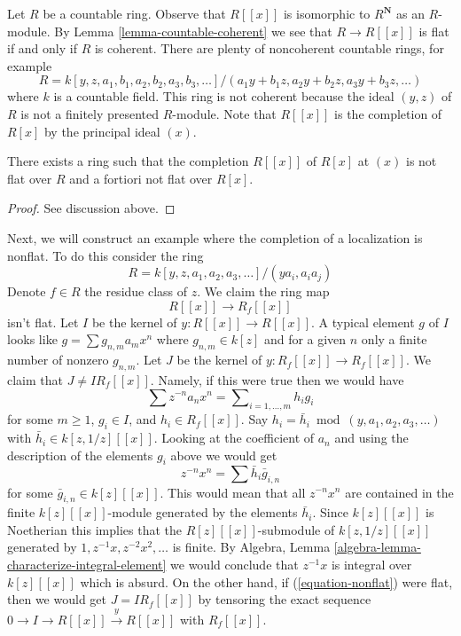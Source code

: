 \noindent
Let $R$ be a countable ring. Observe that $R[[x]]$ is isomorphic to
$R^\mathbf{N}$ as an $R$-module. By Lemma \ref{lemma-countable-coherent}
we see that $R \to R[[x]]$ is flat if and only if $R$ is coherent.
There are plenty of noncoherent countable rings, for example
$$
R = k[y, z, a_1, b_1, a_2, b_2, a_3, b_3, \ldots]/
(a_1 y + b_1 z, a_2 y + b_2 z, a_3 y + b_3 z, \ldots)
$$
where $k$ is a countable field. This ring is not coherent because
the ideal $(y, z)$ of $R$ is not a finitely presented $R$-module.
Note that $R[[x]]$ is the completion of $R[x]$ by the principal
ideal $(x)$.

\begin{lemma}
\label{lemma-completion-polynomial-ring-not-flat}
There exists a ring such that the completion $R[[x]]$ of $R[x]$
at $(x)$ is not flat over $R$ and a fortiori not flat over $R[x]$.
\end{lemma}

\begin{proof}
See discussion above.
\end{proof}

\noindent
Next, we will construct an example where the completion of a localization
is nonflat. To do this consider the ring
$$
R = k[y, z, a_1, a_2, a_3, \ldots]/(ya_i, a_i a_j)
$$
Denote $f \in R$ the residue class of $z$. We claim the ring map
\begin{equation}
\label{equation-nonflat}
R[[x]] \longrightarrow R_f[[x]]
\end{equation}
isn't flat. Let $I$ be the kernel of $y : R[[x]] \to R[[x]]$. A typical
element $g$ of $I$ looks like $g = \sum g_{n, m} a_mx^n$
where $g_{n, m} \in k[z]$ and for a given $n$ only a finite number of
nonzero $g_{n, m}$. Let $J$ be the kernel of $y : R_f[[x]] \to R_f[[x]]$.
We claim that $J \not = I R_f[[x]]$. Namely, if this were true then we
would have
$$
\sum z^{-n} a_n x^n = \sum\nolimits_{i = 1, \ldots, m} h_i g_i
$$
for some $m \geq 1$, $g_i \in I$, and $h_i \in R_f[[x]]$. Say
$h_i = \bar h_i \bmod (y, a_1, a_2, a_3, \ldots)$
with $\bar h_i \in k[z, 1/z][[x]]$.  Looking at the coefficient of
$a_n$ and using the description of the elements $g_i$ above we would get
$$
z^{-n} x^n = \sum \bar h_i \bar g_{i, n}
$$
for some $\bar g_{i, n} \in k[z][[x]]$. This would mean that
all $z^{-n}x^n$ are contained in the finite $k[z][[x]]$-module
generated by the elements $\bar h_i$. Since $k[z][[x]]$ is Noetherian
this implies that the $R[z][[x]]$-submodule of $k[z, 1/z][[x]]$
generated by $1, z^{-1}x, z^{-2}x^2, \ldots$ is finite. By
Algebra, Lemma \ref{algebra-lemma-characterize-integral-element}
we would conclude that $z^{-1}x$ is integral over $k[z][[x]]$
which is absurd. On the other hand,
if (\ref{equation-nonflat}) were flat, then we would
get $J = IR_f[[x]]$ by tensoring the exact sequence
$0 \to I \to R[[x]] \xrightarrow{y} R[[x]]$ with $R_f[[x]]$.

